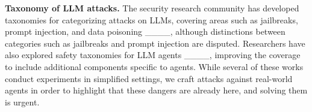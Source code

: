 \textbf{Taxonomy of LLM attacks.} The security research community has developed taxonomies for categorizing attacks on LLMs, covering areas such as jailbreaks, prompt injection, and data poisoning ____, although distinctions between categories such as jailbreaks and prompt injection are disputed. Researchers have also explored safety taxonomies for LLM agents ____, improving the coverage to include additional components specific to agents.  While several of these works conduct experiments in simplified settings, we craft attacks against real-world agents in order to highlight that these dangers are already here, and solving them is urgent.